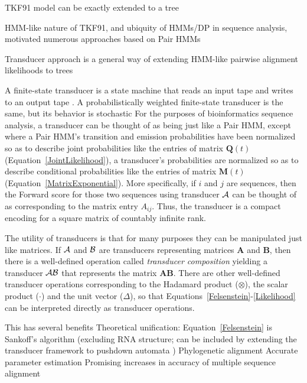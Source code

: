 \documentclass{bmcart}
\newcommand{\matr}[1]{\mathbf{#1}}
\newcommand{\trans}[1]{{\cal #1}}
\newcommand{\eqref}[1]{Equation~\ref{#1}}
\begin{document}
TKF91 model can be exactly extended to a tree \cite{Hein2001,LunterSongMiklosHein2003}

HMM-like nature of TKF91, and ubiquity of HMMs/DP in sequence analysis,
motivated numerous approaches based on Pair HMMs
\cite{ThorneEtal92,KnudsenMiyamoto2003,WangKeightleyJohnson2006,RivasEddy2008,RivasEddy2015}

Transducer approach is a general way of extending HMM-like pairwise alignment likelihoods to trees \cite{Westesson2012-zg,BouchardCote2013,IndelHistorian}

A finite-state transducer is a state machine that reads an input tape and writes to an output tape \cite{Mealy55}.
A probabilistically weighted finite-state transducer is the same, but its behavior is stochastic \cite{MohriPereiraRiley2000}
For the purposes of bioinformatics sequence analysis,
a transducer can be thought of as being just like a Pair HMM,
except where a Pair HMM's transition and emission probabilities
have been normalized so as to describe joint probabilities
like the entries of matrix $\matr{Q}(t)$ (\eqref{JointLikelihood}),
a transducer's probabilities are normalized so as to describe conditional probabilities
like the entries of matrix $\matr{M}(t)$ (\eqref{MatrixExponential}).
More specifically, if $i$ and $j$ are sequences, then the Forward score
for those two sequences using transducer $\trans{A}$
can be thought of as corresponding to the matrix entry $A_{ij}$.
Thus, the transducer is a compact encoding for a square matrix of countably infinite rank.

The utility of transducers is that for many purposes they can be manipulated just like matrices.
If $\trans{A}$ and $\trans{B}$ are transducers representing matrices $\matr{A}$ and $\matr{B}$,
then there is a well-defined operation called {\em transducer composition}
yielding a transducer $\trans{A}\trans{B}$ that represents the matrix $\matr{A}\matr{B}$.
There are other well-defined transducer operations corresponding to the Hadamard product
($\otimes$), the scalar product ($\cdot$) and the unit vector ($\Delta$),
so that Equations~\ref{Felsenstein}-\ref{Likelihood} can be interpreted directly
as transducer operations.

This has several benefits
Theoretical unification: \eqref{Felsenstein} is Sankoff's algorithm \cite{Sankoff85}
(excluding RNA structure; can be included by extending the transducer
framework to pushdown automata \cite{BradleyHolmes2009})
Phylogenetic alignment \cite{RedelingsSuchard2005,RedelingsSuchard2007}
Accurate parameter estimation \cite{Westesson2012-zg,Redelings2014}
Promising increases in accuracy of multiple sequence alignment \cite{IndelHistorian}
\end{document}
